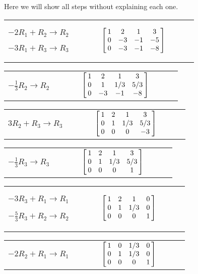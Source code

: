 {Here we will show all steps without explaining each one.

\begin{center}\begin{tabular}{ccl}
\parbox{70pt}{\centering\small $-2R_1+R_2\rightarrow R_2$\\

$-3R_1+R_3\rightarrow R_3$}
&$\quad \quad$&
$\bmx{cccc} 1&2&1&3\\0&-3&-1&-5\\0&-3&-1&-8\emx$
\end{tabular}\end{center}

\begin{center}\begin{tabular}{ccl}
\parbox{70pt}{\centering\small $-\frac13R_2\rightarrow R_2$}
&$\quad \quad$&
$\bmx{cccc} 1&2&1&3\\0&1&1/3&5/3\\0&-3&-1&-8\emx$
\end{tabular}\end{center}

\begin{center}\begin{tabular}{ccl}
\parbox{70pt}{\centering\small $3R_2+R_3\rightarrow R_3$}
&$\quad \quad$&
$\bmx{cccc} 1&2&1&3\\0&1&1/3&5/3\\0&0&0&-3\emx$
\end{tabular}\end{center}

\begin{center}\begin{tabular}{ccl}
\parbox{70pt}{\centering\small $-\frac13R_3\rightarrow R_3$}
&$\quad \quad$&
$\bmx{cccc} 1&2&1&3\\0&1&1/3&5/3\\0&0&0&1\emx$
\end{tabular}\end{center}

\begin{center}\begin{tabular}{ccl}
\parbox{70pt}{\centering\small $-3R_3+R_1\rightarrow R_1$\\

$-\frac53R_3+R_2\rightarrow R_2$}
&$\quad \quad$&
$\bmx{cccc} 1&2&1&0\\0&1&1/3&0\\0&0&0&1\emx$
\end{tabular}\end{center}

\begin{center}\begin{tabular}{ccl}
\parbox{70pt}{\centering\small $-2R_2+R_1\rightarrow R_1$}
&$\quad \quad$&
$\bmx{cccc} 1&0&1/3&0\\0&1&1/3&0\\0&0&0&1\emx$
\end{tabular}
\end{center}
}\\  %
\clearpage

